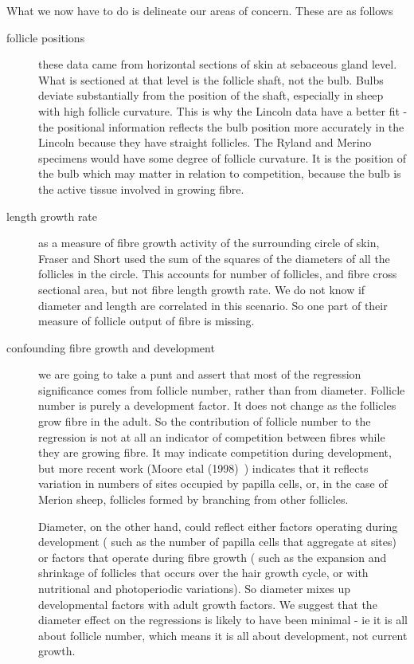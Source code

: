 \documentclass[titlepage]{article}  %
\begin{document}
What we now have to do is delineate our areas of concern. These are as follows
\begin{description}
\item[follicle positions] these data came from horizontal sections of skin at sebaceous gland level. What is sectioned at that level is the follicle shaft, not the bulb.  Bulbs deviate substantially from the position of the shaft, especially in sheep with high follicle curvature. This is why the Lincoln data have a better fit - the positional information reflects the bulb position more accurately in the Lincoln because they have straight follicles. The Ryland and Merino specimens would have some degree of follicle curvature. 
It is the position of the bulb which may matter in relation to competition, because the bulb is the active tissue involved in growing fibre. 
\item[length growth rate] as a measure of fibre growth activity of the surrounding circle of skin, Fraser and Short used the sum of the squares of the diameters of all the follicles in the circle. This accounts for number of follicles, and fibre cross sectional area, but not fibre length growth rate.  We do not know if diameter and length are correlated in this scenario. So one part of their measure of follicle output of fibre is missing.
\item[confounding fibre growth and development] we are going to take a punt and assert that most of the regression significance comes from follicle number, rather than from diameter. Follicle number is purely a development factor. It does not change as the follicles grow fibre in the adult. So the contribution of follicle number to the regression is not at all an indicator of competition between fibres while they are growing fibre. It may indicate competition during development, but more recent work (Moore etal (1998)~\cite{moor:98}) indicates that it reflects variation in numbers of sites occupied by papilla cells, or, in the case of Merion sheep, follicles formed by branching from other follicles. 

Diameter, on the other hand, could reflect either factors operating during development ( such as the number of papilla cells that aggregate at sites) or factors that operate during fibre growth ( such as the expansion and shrinkage of follicles that occurs over the hair growth cycle, or with nutritional and photoperiodic variations). So diameter mixes up developmental factors with adult growth factors.  We suggest that the diameter effect on the regressions is likely to have been minimal - ie it is all about follicle number, which means it is all about development, not current growth.
\end{description}
\end{document}
